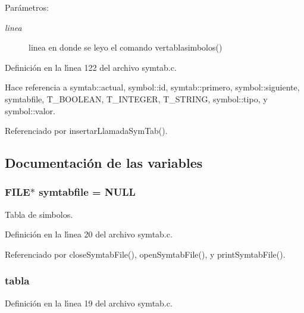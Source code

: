 \begin{Desc}
\item[Par\'{a}metros:]
\begin{description}
\item[{\em linea}]linea en donde se leyo el comando vertablasimbolos() \end{description}
\end{Desc}


Definici\'{o}n en la l\'{\i}nea 122 del archivo symtab.c.

Hace referencia a symtab::actual, symbol::id, symtab::primero, symbol::siguiente, symtabfile, T\_\-BOOLEAN, T\_\-INTEGER, T\_\-STRING, symbol::tipo, y symbol::valor.

Referenciado por insertar\-Llamada\-Sym\-Tab().

\subsection{Documentaci\'{o}n de las variables}
\subsubsection{\setlength{\rightskip}{0pt plus 5cm}FILE$\ast$ {\bf symtabfile} = NULL\hspace{0.3cm}{\tt  [static]}}\label{symtab_8c_a1}


Tabla de simbolos. 



Definici\'{o}n en la l\'{\i}nea 20 del archivo symtab.c.

Referenciado por close\-Symtab\-File(), open\-Symtab\-File(), y print\-Symtab\-File().
\subsubsection{ {\bf tabla}\hspace{0.3cm}{\tt  [static]}}\label{symtab_8c_a0}




Definici\'{o}n en la l\'{\i}nea 19 del archivo symtab.c.